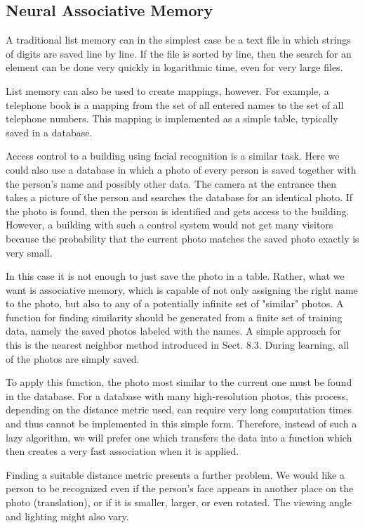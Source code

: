 \documentclass[10pt]{book}
\begin{document}
\subsection*{Neural Associative Memory}
A traditional list memory can in the simplest case be a text file in which strings of digits are saved line by line. If the file is sorted by line, then the search for an element can be done very quickly in logarithmic time, even for very large files.

List memory can also be used to create mappings, however. For example, a telephone book is a mapping from the set of all entered names to the set of all telephone numbers. This mapping is implemented as a simple table, typically saved in a database.

Access control to a building using facial recognition is a similar task. Here we could also use a database in which a photo of every person is saved together with the person's name and possibly other data. The camera at the entrance then takes a picture of the person and searches the database for an identical photo. If the photo is found, then the person is identified and gets access to the building. However, a building with such a control system would not get many visitors because the probability that the current photo matches the saved photo exactly is very small.

In this case it is not enough to just save the photo in a table. Rather, what we want is associative memory, which is capable of not only assigning the right name to the photo, but also to any of a potentially infinite set of "similar" photos. A function for finding similarity should be generated from a finite set of training data, namely the saved photos labeled with the names. A simple approach for this is the nearest neighbor method introduced in Sect. 8.3. During learning, all of the photos are simply saved.

To apply this function, the photo most similar to the current one must be found in the database. For a database with many high-resolution photos, this process, depending on the distance metric used, can require very long computation times and thus cannot be implemented in this simple form. Therefore, instead of such a lazy algorithm, we will prefer one which transfers the data into a function which then creates a very fast association when it is applied.


Finding a suitable distance metric presents a further problem. We would like a person to be recognized even if the person's face appears in another place on the photo (translation), or if it is smaller, larger, or even rotated. The viewing angle and lighting might also vary.
\end{document}
